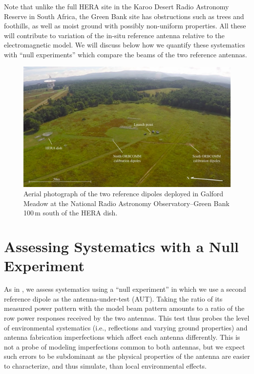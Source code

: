 \documentclass[preprint]{aastex}
\begin{document}
Note that unlike the full HERA site in the Karoo Desert Radio Astronomy Reserve in South Africa, the Green Bank site has obstructions such as trees and foothills, as well as moist ground with possibly non-uniform properties. All these will contribute to variation of the in-situ reference antenna relative to the electromagnetic model. We will discuss below how we quantify these systematics with ``null experiments'' which compare the beams of the two reference antennas.

\begin{figure}[h]
\includegraphics[width=6.5in]{aerial.png}
\caption{Aerial photograph of the two reference dipoles deployed in Galford Meadow at the National Radio Astronomy Observatory--Green Bank 100\,m south of the HERA dish.}
\label{fig:aerial}
\end{figure}

\section{Assessing Systematics with a Null Experiment}

As in \citet{neben15}, we assess systematics using a ``null experiment'' in which we use a second reference dipole as the antenna-under-test (AUT). Taking the ratio of its measured power pattern with the model beam pattern amounts to a ratio of the row power responses received by the two antennas. This test thus probes the level of environmental systematics (i.e., reflections and varying ground properties) and antenna fabrication imperfections which affect each antenna differently. This is not a probe of modeling imperfections common to both antennas, but we expect such errors to be subdominant as the physical properties of the antenna are easier to characterize, and thus simulate, than local environmental effects. 
\end{document}
